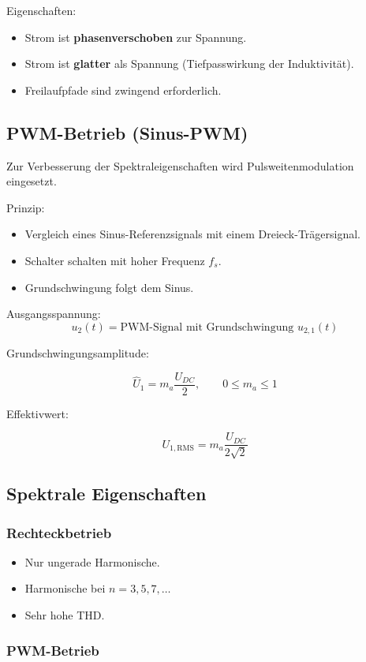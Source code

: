 Eigenschaften:
\begin{itemize}
\item Strom ist \textbf{phasenverschoben} zur Spannung.
\item Strom ist \textbf{glatter} als Spannung (Tiefpasswirkung der Induktivität).
\item Freilaufpfade sind zwingend erforderlich.
\end{itemize}

\subsection{PWM-Betrieb (Sinus-PWM)}

Zur Verbesserung der Spektraleigenschaften wird Pulsweitenmodulation eingesetzt.

Prinzip:
\begin{itemize}
\item Vergleich eines Sinus-Referenzsignals mit einem Dreieck-Trägersignal.
\item Schalter schalten mit hoher Frequenz $f_s$.
\item Grundschwingung folgt dem Sinus.
\end{itemize}

Ausgangsspannung:
\[
u_2(t) = \text{PWM-Signal mit Grundschwingung } u_{2,1}(t)
\]

Grundschwingungsamplitude:

\[
\boxed{\hat U_1 = m_a \frac{U_{DC}}{2}}, 
\qquad 0 \le m_a \le 1
\]

Effektivwert:

\[
\boxed{U_{1,\mathrm{RMS}} = m_a \frac{U_{DC}}{2\sqrt{2}}}
\]

\subsection{Spektrale Eigenschaften}

\subsubsection{Rechteckbetrieb}

\begin{itemize}
\item Nur ungerade Harmonische.
\item Harmonische bei $n = 3,5,7,\ldots$
\item Sehr hohe THD.
\end{itemize}

\subsubsection{PWM-Betrieb}

